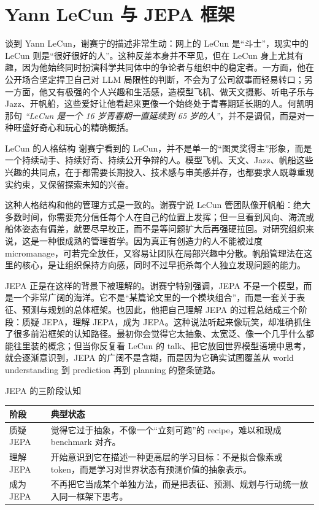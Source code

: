 \section{Yann LeCun 与 JEPA 框架}

谈到 Yann LeCun，谢赛宁的描述非常生动：网上的 LeCun 是“斗士”，现实中的 LeCun 则是“很好很好的人”。这种反差本身并不罕见，但在 LeCun 身上尤其有趣，因为他始终同时扮演科学共同体中的争论者与组织中的稳定者。一方面，他在公开场合坚定捍卫自己对 LLM 局限性的判断，不会为了公司叙事而轻易转口；另一方面，他又有极强的个人兴趣和生活感，造模型飞机、做天文摄影、听电子乐与 Jazz、开帆船，这些爱好让他看起来更像一个始终处于青春期延长期的人。何凯明那句 \textit{``LeCun 是一个 16 岁青春期一直延续到 65 岁的人''}，并不是调侃，而是对一种旺盛好奇心和玩心的精确概括。

\begin{knowledgebox}{LeCun 的人格结构}
谢赛宁看到的 LeCun，并不是单一的“图灵奖得主”形象，而是一个持续动手、持续好奇、持续公开争辩的人。模型飞机、天文、Jazz、帆船这些兴趣的共同点，在于都需要长期投入、技术感与审美感并存，也都要求人既尊重现实约束，又保留探索未知的兴奋。
\end{knowledgebox}

这种人格结构和他的管理方式是一致的。谢赛宁说 LeCun 管团队像开帆船：绝大多数时间，你需要充分信任每个人在自己的位置上发挥；但一旦看到风向、海流或船体姿态有偏差，就要尽早校正，而不是等问题扩大后再强硬拉回。对研究组织来说，这是一种很成熟的管理哲学。因为真正有创造力的人不能被过度 micromanage，可若完全放任，又容易让团队在局部兴趣中分散。帆船管理法在这里的核心，是让组织保持方向感，同时不过早扼杀每个人独立发现问题的能力。

JEPA 正是在这样的背景下被理解的。谢赛宁特别强调，JEPA 不是一个模型，而是一个非常广阔的海洋。它不是“某篇论文里的一个模块组合”，而是一套关于表征、预测与规划的总体框架。也因此，他把自己理解 JEPA 的过程总结成三个阶段：质疑 JEPA，理解 JEPA，成为 JEPA。这种说法听起来像玩笑，却准确抓住了很多前沿框架的认知路径。最初你会觉得它太抽象、太宽泛、像一个几乎什么都能往里装的概念；但当你反复看 LeCun 的 talk、把它放回世界模型语境中思考，就会逐渐意识到，JEPA 的广阔不是含糊，而是因为它确实试图覆盖从 world understanding 到 prediction 再到 planning 的整条链路。

\begin{importantbox}{JEPA 的三阶段认知}
\begin{tabularx}{\textwidth}{>{\raggedright\arraybackslash}p{} Y}
\toprule
阶段 & 典型状态 \\
\midrule
质疑 JEPA & 觉得它过于抽象，不像一个“立刻可跑”的 recipe，难以和现成 benchmark 对齐。 \\
理解 JEPA & 开始意识到它在描述一种更高层的学习目标：不是拟合像素或 token，而是学习对世界状态有预测价值的抽象表示。 \\
成为 JEPA & 不再把它当成某个单独方法，而是把表征、预测、规划与行动统一放入同一框架下思考。 \\
\bottomrule
\end{tabularx}
\end{importantbox}

